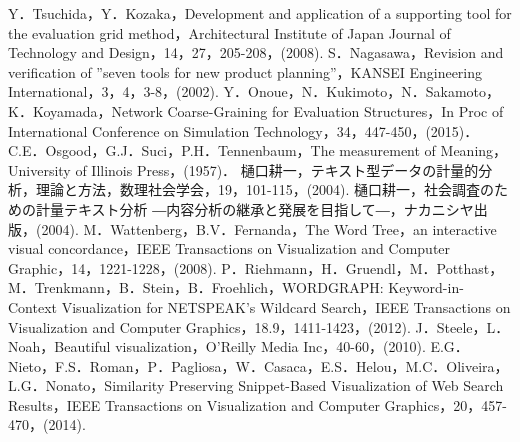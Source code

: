\documentclass[syuuron]{kuee}
\begin{document}
\begin{thebibliography}{数字}
	 Y．Tsuchida，Y．Kozaka，Development and application of a supporting tool for the evaluation grid method，Architectural Institute of Japan Journal of Technology and Design，14，27，205-208，(2008).
	 S．Nagasawa，Revision and verification of ”seven tools for new product planning”，KANSEI Engineering International，3，4，3-8，(2002).
	 Y．Onoue，N．Kukimoto，N．Sakamoto，K．Koyamada，Network Coarse-Graining for Evaluation Structures，In Proc of International Conference on Simulation Technology，34，447-450，(2015)．
	 C.E．Osgood，G.J．Suci，P.H．Tennenbaum，The measurement of Meaning，University of Illinois Press，(1957)．
	 樋口耕一，テキスト型データの計量的分析，理論と方法，数理社会学会，19，101-115，(2004).
	 樋口耕一，社会調査のための計量テキスト分析 ―内容分析の継承と発展を目指して―，ナカニシヤ出版，(2004).
	 M．Wattenberg，B.V．Fernanda，The Word Tree，an interactive visual concordance，IEEE Transactions on Visualization and Computer Graphic，14，1221-1228，(2008).
	 P．Riehmann，H．Gruendl，M．Potthast，M．Trenkmann，B．Stein，B．Froehlich，WORDGRAPH: Keyword-in-Context Visualization for NETSPEAK's Wildcard Search，IEEE Transactions on Visualization and Computer Graphics，18.9，1411-1423，(2012).
	 J．Steele，L．Noah，Beautiful visualization，O'Reilly Media Inc，40-60，(2010).
	 E.G．Nieto，F.S．Roman，P．Pagliosa，W．Casaca，E.S．Helou，M.C．Oliveira，L.G．Nonato，Similarity Preserving Snippet-Based Visualization of Web Search Results，IEEE Transactions on Visualization and Computer Graphics，20，457-470，(2014).


\end{thebibliography}
\end{document}
